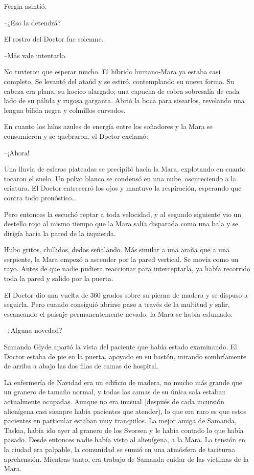 Fergin asintió.

--¿Eso la detendrá?

El rostro del Doctor fue solemne.

--Más vale intentarlo.

No tuvieron que esperar mucho. El híbrido humano-Mara ya estaba casi completo. Se levantó del ataúd y se estiró, contemplando su nueva forma. Su cabeza era plana, su hocico alargado; una capucha de cobra sobresalía de cada lado de su pálida y rugosa garganta. Abrió la boca para sisearlos, revelando una lengua bífida negra y colmillos curvados.

En cuanto los hilos azules de energía entre los soñadores y la Mara se consumieron y se quebraron, el Doctor exclamó:

--¡Ahora!

Una lluvia de esferas plateadas se precipitó hacia la Mara, explotando en cuanto tocaron el suelo. Un polvo blanco se condensó en una nube, oscureciendo a la criatura. El Doctor entrecerró los ojos y mantuvo la respiración, esperando que contra todo pronóstico…

Pero entonces la escuchó reptar a toda velocidad, y al segundo siguiente vio un destello rojo al mismo tiempo que la Mara salía disparada como una bala y se dirigía hacia la pared de la izquierda.

Hubo gritos, chillidos, dedos señalando. Más similar a una araña que a una serpiente, la Mara empezó a ascender por la pared vertical. Se movía como un rayo. Antes de que nadie pudiera reaccionar para interceptarla, ya había recorrido toda la pared y salido por la puerta.

El Doctor dio una vuelta de 360 grados sobre su pierna de madera y se dispuso a seguirla. Pero cuando consiguió abrirse paso a través de la multitud y salir, escaneando el paisaje permanentemente nevado, la Mara se había esfumado.



--¿Alguna novedad?

Samanda Glyde apartó la vista del paciente que había estado examinando. El Doctor estaba de pie en la puerta, apoyado en su bastón, mirando sombríamente de arriba a abajo las dos filas de camas de hospital.

La enfermería de Navidad era un edificio de madera, no mucho más grande que un granero de tamaño normal, y todas las camas de su única sala estaban actualmente ocupadas. Aunque no era inusual (después de cada incursión alienígena casi siempre había pacientes que atender), lo que era raro es que estos pacientes en particular estaban muy tranquilos. La mejor amiga de Samanda, Taskia, había ido ayer al granero de los Svorsen y le había contado lo que había pasado. Desde entonces nadie había visto al alienígena, a la Mara. La tensión en la ciudad era palpable, la comunidad se sumió en una atmósfera de taciturna aprehensión. Mientras tanto, era trabajo de Samanda cuidar de las víctimas de la Mara.

